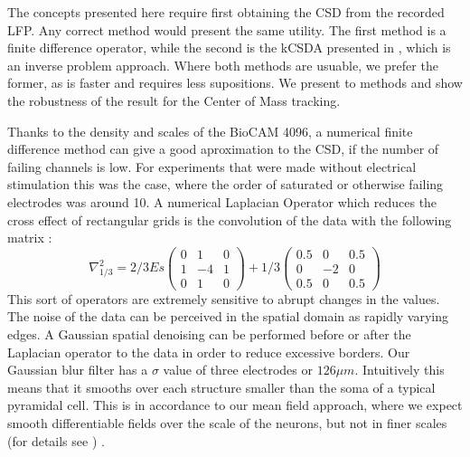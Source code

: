 \documentclass{article}
\begin{document}
The concepts presented here require first obtaining the CSD from the recorded LFP. Any correct method would present the same utility. The first method is a  finite difference operator, while the second is the kCSDA presented in \cite{Potworowski2011}, which is an inverse problem approach.  Where both methods are usuable, we prefer the former, as is faster and requires less supositions. We present to methods and show the robustness of the result for the Center of Mass tracking. 

Thanks to the density and scales of the BioCAM 4096, a numerical finite difference method
can give a good aproximation to the CSD, if the number of failing channels is low. For experiments that were made without electrical stimulation this was the case, where the order of saturated or otherwise failing electrodes was around 10.  A  numerical Laplacian Operator which reduces the cross effect of rectangular grids is the convolution of the data with the following matrix \cite{Lindberg90}:
\begin{equation}
\nabla^2_{1/3}=2/3Es
\begin{pmatrix}
  0 & 1 & 0 \\
  1 & -4 & 1 \\
  0 & 1 & 0
\end{pmatrix}
+1/3
\begin{pmatrix}
  0.5 & 0 & 0.5 \\
  0 & -2 & 0 \\
  0.5 & 0 & 0.5
\end{pmatrix}  
\end{equation}
This sort of operators are extremely sensitive to abrupt changes in the values. The noise of the data can be perceived in the spatial domain as rapidly varying edges. A Gaussian spatial denoising can be performed before or after the Laplacian operator to the data in order to reduce excessive borders. Our Gaussian blur filter has a $\sigma$ value of three electrodes or $126 \mu m$. Intuitively this means that it smooths over each structure smaller than the soma of a typical pyramidal cell. 
This is  in accordance to our mean field approach, where we expect smooth differentiable fields over the scale of the neurons, but not in finer scales (for details see \cite{Bedard11}) .
\end{document}
